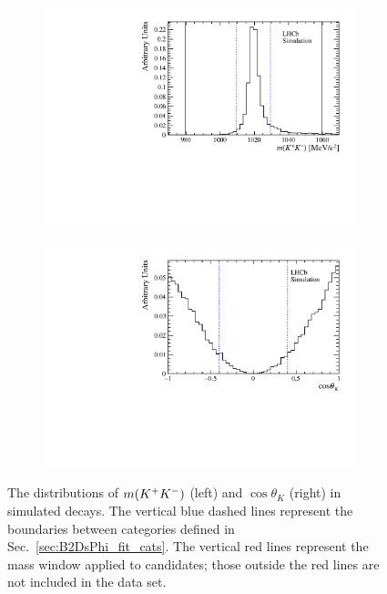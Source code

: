 \begin{figure}[!h]
    \centering
    \begin{subfigure}[t]{0.48\textwidth}
        \centering
        \includegraphics[width=1.0\textwidth]{figs/B2DsPhi/MC_Distributions_mass_B2DsPhi.pdf}
    \end{subfigure}
    \begin{subfigure}[t]{0.48\textwidth}
        \centering
        \includegraphics[width=1.0\textwidth]{figs/B2DsPhi/MC_Distributions_angle_B2DsPhi.pdf}
    \end{subfigure}
    \caption{The distributions of $m({{K}^+}{{K}^-})$ (left) and $\cos\theta_{K}$ (right) in simulated \decay{\Bp}{\Dsp\phiz} decays. The vertical blue dashed lines represent the boundaries between categories defined in Sec.~\ref{sec:B2DsPhi_fit_cats}. The vertical red lines represent the mass window applied to candidates; those outside the red lines are not included in the data set.}
    \label{fig:B2DsPhi_hel_mass_MC}   
\end{figure}


